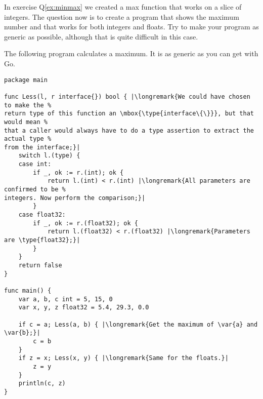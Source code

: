 \begin{Exercise}[title={Interfaces and max()},difficulty=2]
\Question
In exercise Q\ref{ex:minmax} we created a max function that works on
a slice of integers.
The question now is to create
a program that shows the maximum number and that works for both integers and floats.
Try to make your program as generic as possible, although that is quite difficult in
this case.
\end{Exercise}

\begin{Answer}
\Question
The following program calculates a maximum. It is as generic as you can get
with Go.

\begin{lstlisting}[caption=Generic way of calculating a maximum]
package main

func Less(l, r interface{}) bool { |\longremark{We could have chosen to make the %
return type of this function an \mbox{\type{interface\{\}}}, but that would mean %
that a caller would always have to do a type assertion to extract the actual type %
from the interface;}|
	switch l.(type) {
	case int:
		if _, ok := r.(int); ok {
			return l.(int) < r.(int) |\longremark{All parameters are confirmed to be %
integers. Now perform the comparison;}|
		}
	case float32:
		if _, ok := r.(float32); ok {
			return l.(float32) < r.(float32) |\longremark{Parameters are \type{float32};}|
		}
	}
	return false
}

func main() {
	var a, b, c int = 5, 15, 0
	var x, y, z float32 = 5.4, 29.3, 0.0

	if c = a; Less(a, b) { |\longremark{Get the maximum of \var{a} and \var{b};}|
		c = b
	}
	if z = x; Less(x, y) { |\longremark{Same for the floats.}|
		z = y
	}
	println(c, z)
}
\end{lstlisting}
\showremarks
\end{Answer}
